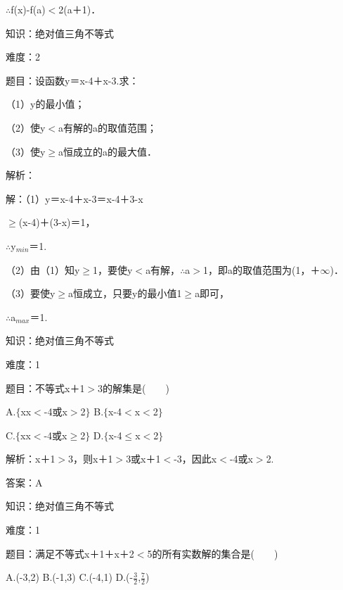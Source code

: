 \documentclass{article} %
\begin{document}
$\mathrm{\therefore}${\textbar}f(x)-f(a){\textbar}$\mathrm{<}$2({\textbar}a{\textbar}＋1)．



知识：绝对值三角不等式

难度：2

题目：设函数y＝{\textbar}x-4{\textbar}＋{\textbar}x-3{\textbar}.求：

（1）y的最小值；

（2）使y$\mathrm{<}$a有解的a的取值范围；

（3）使y$\mathrm{\ge}$a恒成立的a的最大值．

解析：

解：（1）y＝{\textbar}x-4{\textbar}＋{\textbar}x-3{\textbar}＝{\textbar}x-4{\textbar}＋{\textbar}3-x{\textbar}

$\mathrm{\ge}${\textbar}(x-4)＋(3-x){\textbar}＝1，

$\mathrm{\therefore}$y${}_{min}$＝1.

（2）由（1）知y$\mathrm{\ge}$1，要使y$\mathrm{<}$a有解，$\mathrm{\therefore}$a$\mathrm{>}$1，即a的取值范围为(1，＋$\mathrm{\infty}$)．

（3）要使y$\mathrm{\ge}$a恒成立，只要y的最小值1$\mathrm{\ge}$a即可，

$\mathrm{\therefore}$a${}_{max}$＝1.



知识：绝对值三角不等式

难度：1

题目：不等式{\textbar}x＋1{\textbar}$\mathrm{>}$3的解集是(　　)

A.$\mathrm{\{}$x{\textbar}x$\mathrm{<}$-4或x$\mathrm{>}$2$\mathrm{\}}$  B.$\mathrm{\{}$x{\textbar}-4$\mathrm{<}$x$\mathrm{<}$2$\mathrm{\}}$

C.$\mathrm{\{}$x{\textbar}x$\mathrm{<}$-4或x$\mathrm{\ge}$2$\mathrm{\}}$  D.$\mathrm{\{}$x{\textbar}-4$\mathrm{\le}$x$\mathrm{<}$2$\mathrm{\}}$

解析：{\textbar}x＋1{\textbar}$\mathrm{>}$3，则x＋1$\mathrm{>}$3或x＋1$\mathrm{<}$-3，因此x$\mathrm{<}$-4或x$\mathrm{>}$2.

答案：A



知识：绝对值三角不等式

难度：1

题目：满足不等式{\textbar}x＋1{\textbar}＋{\textbar}x＋2{\textbar}$\mathrm{<}$5的所有实数解的集合是(　　)

A.(-3,2)   B.(-1,3)   C.(-4,1)   D.(-$\frac{3}{2}$,$\frac{7}{2}$)
\end{document}
